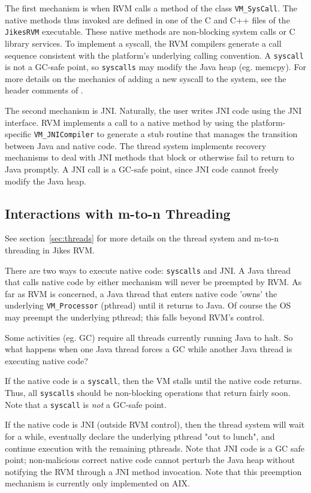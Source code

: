 The first mechanism is when RVM calls a method of the class {\tt VM\_SysCall}.
The native methods thus invoked are defined in one of the
C and C++ files of the {\tt JikesRVM} executable. 
These native methods are non-blocking system calls or C library 
services.  To implement a syscall, the RVM compilers generate a call
sequence consistent with the platform's underlying calling convention.
A {\tt syscall} is not a GC-safe point, so {\tt syscalls} may modify the
Java heap (eg. memcpy). For more details on the mechanics of adding a
new syscall to the system, see the header comments of 
.

The second mechanism is JNI.  Naturally, the user writes JNI code
using the JNI interface.  RVM implements a call to a native method by
using the platform-specific {\tt VM\_JNICompiler} to generate a stub
routine that manages the transition between Java and native code.  The
thread system implements recovery mechanisms to deal with JNI methods
that block or otherwise fail to return to Java promptly.  A JNI call
is a GC-safe point, since JNI code cannot freely modify the Java heap.

\subsection{Interactions with m-to-n Threading}
See section~\ref{sec:threads} for more details on the thread system
and m-to-n threading in Jikes RVM. 

There are two ways to execute native code: {\tt syscalls} and JNI.
A Java thread that calls native code by either mechanism will never
be preempted by RVM.  As far as RVM is concerned, a Java thread that
enters native code 'owns' the underlying {\tt VM\_Processor} (pthread)
until it returns to Java.  Of course the OS may preempt the underlying
pthread; this falls beyond RVM's control.

Some activities (eg. GC) require all threads currently running Java to halt.  
So what happens when one Java thread forces a GC while another Java thread is
executing native code?

If the native code is a {\tt syscall}, then the VM stalls until the native
code returns.  Thus, all {\tt syscalls} should be non-blocking
operations that return fairly soon.  Note that a {\tt syscall} is 
{\em not} a GC-safe point.

If the native code is JNI (outside RVM control), then the thread system
will wait for a while, eventually declare the underlying pthread "out to
lunch", and continue execution with the remaining pthreads.  Note that 
JNI code is a GC safe point; non-malicious correct native code cannot
perturb the Java heap without notifying the RVM through a JNI method
invocation.  Note that this preemption mechanism is currently only
implemented on AIX.

